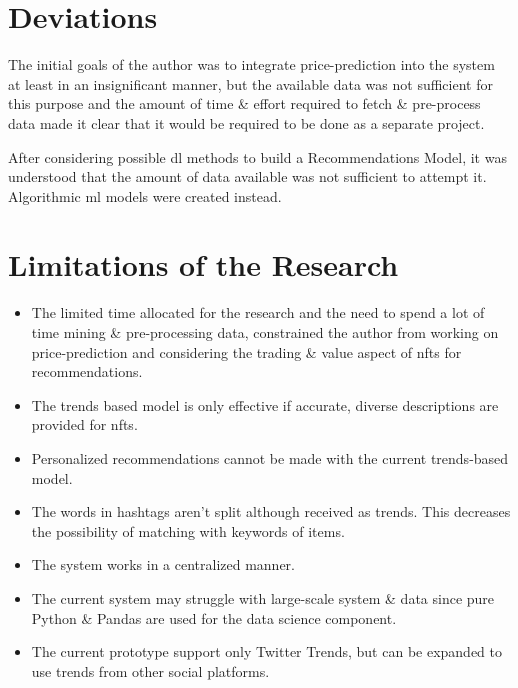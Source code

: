 \section{Deviations}
The initial goals of the author was to integrate price-prediction into the system at least in an insignificant manner, but the available data was not sufficient for this purpose and the amount of time \& effort required to fetch \& pre-process data made it clear that it would be required to be done as a separate project.

After considering possible \gls{dl} methods to build a Recommendations Model, it was understood that the amount of data available was not sufficient to attempt it. Algorithmic \gls{ml} models were created instead.

\section{Limitations of the Research}
\begin{itemize}
\item  The limited time allocated for the research and the need to spend a lot of time mining \& pre-processing data, constrained the author from working on price-prediction and considering the trading \& value aspect of \gls{nft}s for recommendations.
\item The trends based model is only effective if accurate, diverse descriptions are provided for \gls{nft}s.
\item Personalized recommendations cannot be made with the current trends-based model.
\item The words in hashtags aren't split although received as trends. This decreases the possibility of matching with keywords of items.
\item The system works in a centralized manner.
\item The current system may struggle with large-scale system \& data since pure Python \& Pandas are used for the data science component.
\item The current prototype support only Twitter Trends, but can be expanded to use trends from other social platforms.
\end{itemize}


